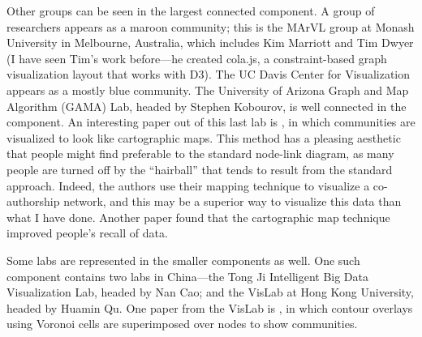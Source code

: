 Other groups can be seen in the largest connected component. A group of
researchers appears as a maroon community; this is the MArVL group at
Monash University in Melbourne, Australia, which includes Kim Marriott
and Tim Dwyer (I have seen Tim's work before---he created cola.js, a
constraint-based graph visualization layout that works with D3). The UC
Davis Center for Visualization appears as a mostly blue community. The
University of Arizona Graph and Map Algorithm (GAMA) Lab, headed by
Stephen Kobourov, is well connected in the component. An interesting
paper out of this last lab is \autocite{gansner_gmap:_2010}, in which
communities are visualized to look like cartographic maps. This method
has a pleasing aesthetic that people might find preferable to the
standard node-link diagram, as many people are turned off by the
``hairball'' that tends to result from the standard approach. Indeed,
the authors use their mapping technique to visualize a co-authorship
network, and this may be a superior way to visualize this data than what
I have done. Another paper \autocite{saket_map-based_2015} found that
the cartographic map technique improved people's recall of data.

Some labs are represented in the smaller components as well. One such
component contains two labs in China---the Tong Ji Intelligent Big Data
Visualization Lab, headed by Nan Cao; and the VisLab at Hong Kong
University, headed by Huamin Qu. One paper from the VisLab is
\autocite{wu_interactive_2015}, in which contour overlays using Voronoi
cells are superimposed over nodes to show communities.









